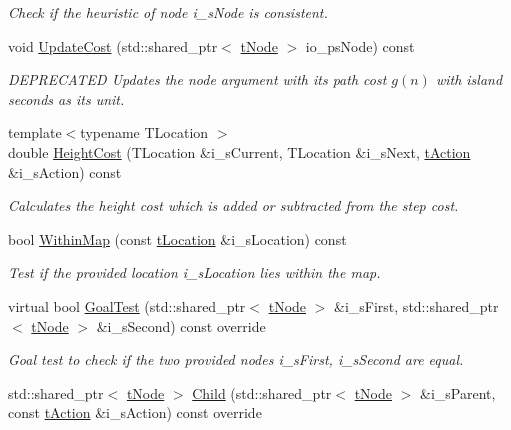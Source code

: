 \begin{DoxyCompactItemize}
\begin{DoxyCompactList}\small\item\em Check if the heuristic of node i\+\_\+s\+Node is consistent. \end{DoxyCompactList}\item 
void \mbox{\hyperlink{classplanner_1_1c_planner_a16e8c156297fff49a6ba9b97073baffb}{Update\+Cost}} (std\+::shared\+\_\+ptr$<$ \mbox{\hyperlink{structplanner_1_1t_node}{t\+Node}} $>$ io\+\_\+ps\+Node) const
\begin{DoxyCompactList}\small\item\em D\+E\+P\+R\+E\+C\+A\+T\+ED Updates the node argument with its path cost $g(n)$ with island seconds as its unit. \end{DoxyCompactList}\item 
{\footnotesize template$<$typename T\+Location $>$ }\\double \mbox{\hyperlink{classplanner_1_1c_planner_a9d57a0697bb0e4666f4fd45f77c4a1aa}{Height\+Cost}} (T\+Location \&i\+\_\+s\+Current, T\+Location \&i\+\_\+s\+Next, \mbox{\hyperlink{structplanner_1_1t_action}{t\+Action}} \&i\+\_\+s\+Action) const
\begin{DoxyCompactList}\small\item\em Calculates the height cost which is added or subtracted from the step cost. \end{DoxyCompactList}\item 
bool \mbox{\hyperlink{classplanner_1_1c_planner_ac5119e3243d9f6747f1da0ed6d356642}{Within\+Map}} (const \mbox{\hyperlink{structplanner_1_1t_location}{t\+Location}} \&i\+\_\+s\+Location) const
\begin{DoxyCompactList}\small\item\em Test if the provided location i\+\_\+s\+Location lies within the map. \end{DoxyCompactList}\item 
virtual bool \mbox{\hyperlink{classplanner_1_1c_planner_a7050795c7174d0ec427fc91f8756a3d8}{Goal\+Test}} (std\+::shared\+\_\+ptr$<$ \mbox{\hyperlink{structplanner_1_1t_node}{t\+Node}} $>$ \&i\+\_\+s\+First, std\+::shared\+\_\+ptr$<$ \mbox{\hyperlink{structplanner_1_1t_node}{t\+Node}} $>$ \&i\+\_\+s\+Second) const override
\begin{DoxyCompactList}\small\item\em Goal test to check if the two provided nodes i\+\_\+s\+First, i\+\_\+s\+Second are equal. \end{DoxyCompactList}\item 
std\+::shared\+\_\+ptr$<$ \mbox{\hyperlink{structplanner_1_1t_node}{t\+Node}} $>$ \mbox{\hyperlink{classplanner_1_1c_planner_ab260cfcb0ad00d46b02148d19faf040d}{Child}} (std\+::shared\+\_\+ptr$<$ \mbox{\hyperlink{structplanner_1_1t_node}{t\+Node}} $>$ \&i\+\_\+s\+Parent, const \mbox{\hyperlink{structplanner_1_1t_action}{t\+Action}} \&i\+\_\+s\+Action) const override

\end{DoxyCompactItemize}
